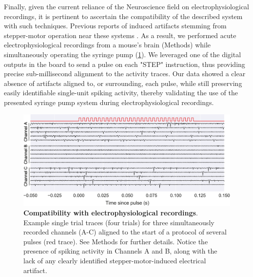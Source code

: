 Finally, given the current reliance of the Neuroscience field on electrophysiological recordings, it is pertinent to ascertain the compatibility of the described system with such techniques. Previous reports of induced artifacts stemming from stepper-motor operation near these systems \citep{Amarante2019}. As a result, we performed acute electrophysiological recordings from a mouse's brain (Methods) while simultaneously operating the syringe pump (\cref{fig:Ephys}). 
We leveraged one of the digital outputs in the board to send a pulse on each "STEP" instruction, thus providing precise sub-millisecond alignment to the activity traces. 
Our data showed a clear absence of artifacts aligned to, or surrounding, each pulse, while still preserving easily identifiable single-unit spiking activity, thereby validating the use of the presented syringe pump system during electrophysiological recordings.

\begin{figure}[ht] 
	\centering
	\includegraphics[width=1.0\linewidth]{Figures/Artboard 7.pdf}
	\caption{\textbf{Compatibility with electrophysiological recordings}.\\
	Example single trial traces (four trials) for three simultaneously recorded channels (A-C) aligned to the start of a protocol of several pulses (red trace). See Methods for further details. Notice the presence of spiking activity in Channels A and B, along with the lack of any clearly identified stepper-motor-induced electrical artifact.}	
	\label{fig:Ephys}
\end{figure}




